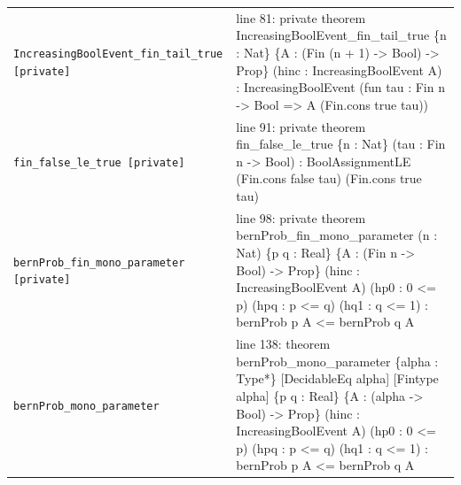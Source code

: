 \documentclass[10pt]{article}
\begin{document}
\begin{longtable}{>{\raggedright\arraybackslash}p{} >{\raggedright\arraybackslash}p{}}
\texttt{IncreasingBoolEvent\_\allowbreak{}fin\_\allowbreak{}tail\_\allowbreak{}true [private]} & {\ttfamily\scriptsize line 81:\allowbreak{} private theorem IncreasingBoolEvent\_\allowbreak{}fin\_\allowbreak{}tail\_\allowbreak{}true \{n :\allowbreak{} Nat\} \{A :\allowbreak{} (\allowbreak{}Fin (\allowbreak{}n +\allowbreak{} 1)\allowbreak{} -\allowbreak{}> Bool)\allowbreak{} -\allowbreak{}> Prop\} (\allowbreak{}hinc :\allowbreak{} IncreasingBoolEvent A)\allowbreak{} :\allowbreak{} IncreasingBoolEvent (\allowbreak{}fun tau :\allowbreak{} Fin n -\allowbreak{}> Bool =\allowbreak{}> A (\allowbreak{}Fin.\allowbreak{}cons true tau)\allowbreak{})\allowbreak{}} \\[0.45em]
\texttt{fin\_\allowbreak{}false\_\allowbreak{}le\_\allowbreak{}true [private]} & {\ttfamily\scriptsize line 91:\allowbreak{} private theorem fin\_\allowbreak{}false\_\allowbreak{}le\_\allowbreak{}true \{n :\allowbreak{} Nat\} (\allowbreak{}tau :\allowbreak{} Fin n -\allowbreak{}> Bool)\allowbreak{} :\allowbreak{} BoolAssignmentLE (\allowbreak{}Fin.\allowbreak{}cons false tau)\allowbreak{} (\allowbreak{}Fin.\allowbreak{}cons true tau)\allowbreak{}} \\[0.45em]
\texttt{bernProb\_\allowbreak{}fin\_\allowbreak{}mono\_\allowbreak{}parameter [private]} & {\ttfamily\scriptsize line 98:\allowbreak{} private theorem bernProb\_\allowbreak{}fin\_\allowbreak{}mono\_\allowbreak{}parameter (\allowbreak{}n :\allowbreak{} Nat)\allowbreak{} \{p q :\allowbreak{} Real\} \{A :\allowbreak{} (\allowbreak{}Fin n -\allowbreak{}> Bool)\allowbreak{} -\allowbreak{}> Prop\} (\allowbreak{}hinc :\allowbreak{} IncreasingBoolEvent A)\allowbreak{} (\allowbreak{}hp0 :\allowbreak{} 0 <=\allowbreak{} p)\allowbreak{} (\allowbreak{}hpq :\allowbreak{} p <=\allowbreak{} q)\allowbreak{} (\allowbreak{}hq1 :\allowbreak{} q <=\allowbreak{} 1)\allowbreak{} :\allowbreak{} bernProb p A <=\allowbreak{} bernProb q A} \\[0.45em]
\texttt{bernProb\_\allowbreak{}mono\_\allowbreak{}parameter} & {\ttfamily\scriptsize line 138:\allowbreak{} theorem bernProb\_\allowbreak{}mono\_\allowbreak{}parameter \{alpha :\allowbreak{} Type*\allowbreak{}\} [DecidableEq alpha] [Fintype alpha] \{p q :\allowbreak{} Real\} \{A :\allowbreak{} (\allowbreak{}alpha -\allowbreak{}> Bool)\allowbreak{} -\allowbreak{}> Prop\} (\allowbreak{}hinc :\allowbreak{} IncreasingBoolEvent A)\allowbreak{} (\allowbreak{}hp0 :\allowbreak{} 0 <=\allowbreak{} p)\allowbreak{} (\allowbreak{}hpq :\allowbreak{} p <=\allowbreak{} q)\allowbreak{} (\allowbreak{}hq1 :\allowbreak{} q <=\allowbreak{} 1)\allowbreak{} :\allowbreak{} bernProb p A <=\allowbreak{} bernProb q A} \\[0.45em]

\end{longtable}
\end{document}
